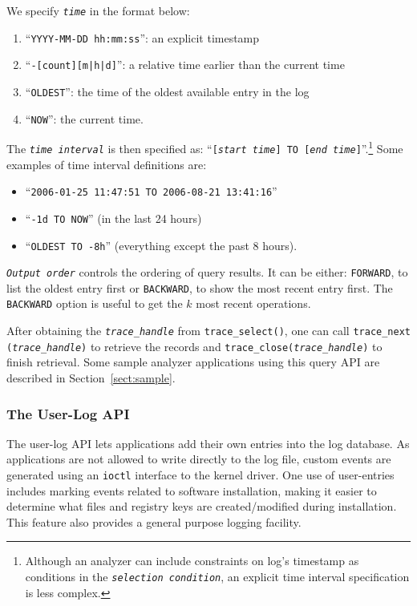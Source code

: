 We specify {\small\tt {\it time}} in the format below:
\begin{enumerate}
\item ``{\small\tt YYYY-MM-DD hh:mm:ss}'': an explicit timestamp
\item ``{\small\tt -[count][m|h|d]}'': a relative time earlier than the current time
\item ``{\small\tt OLDEST}'': the time of the oldest available entry in the log
\item ``{\small\tt NOW}'': the current time.
\end{enumerate}

The {\small\tt {\it time interval}} is then specified as: ``{\small\tt [{\it start time}] 
TO [{\it end time}]}''.\footnote{ Although an
analyzer can include constraints on log's timestamp as conditions in the
{\small\tt {\it selection condition}}, an explicit time interval specification is
less complex.  }
Some examples of time interval definitions are:

\begin{itemize}
\item ``{\small\tt 2006-01-25 11:47:51 TO 2006-08-21 13:41:16}''
\item ``{\small\tt -1d TO NOW}'' (in the last 24 hours)
\item ``{\small\tt OLDEST TO -8h}'' (everything except the past 8 hours).
\end{itemize}

{\small\tt {\it Output order}} controls the ordering of query results.  It can be
either: {\small\tt FORWARD}, to list the oldest entry first or {\small\tt BACKWARD}, to
show the most recent entry first.  The {\small\tt BACKWARD} option is useful to get
the $k$ most recent operations.

After obtaining the {\small\tt {\it trace\_handle}} from {\small\tt trace\_select()},
one can call {\small\tt trace\_next ({\it trace\_handle})} to retrieve the records
and {\small\tt trace\_close({\it trace\_handle})} to finish retrieval.
Some sample analyzer applications using this query API are described in
Section~\ref{sect:sample}.


\subsubsection{The User-Log API}
\label{sect:custlog}

The user-log API lets applications add their own entries into the log
database.  As applications are not allowed to write directly to the log file,
custom events are generated using an {\small\tt ioctl} interface to the kernel
driver.  One use of user-entries includes marking events related to software
installation, making it easier to determine what files and registry keys are
created/modified during installation.  This feature also provides a general
purpose logging facility.

